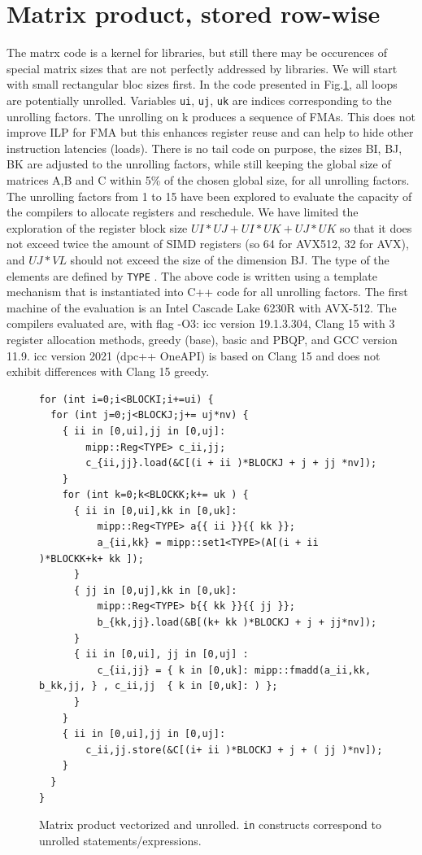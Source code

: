 \documentclass[sigconf,review]{acmart}
\begin{document}
\section{Matrix product, stored row-wise}
The matrx code is a kernel for libraries, but still there may be occurences of special matrix sizes that are not perfectly addressed by libraries. We will start with small rectangular bloc sizes first. In the code presented in Fig.\ref{fig:gemm}, all loops are potentially unrolled. Variables \texttt{ui}, \texttt{uj}, \texttt{uk}
are indices corresponding to the unrolling factors. The unrolling on k
produces a sequence of FMAs. This does not improve ILP for FMA but
this enhances register reuse and can help to hide other instruction
latencies (loads).  There is no tail code on purpose, the sizes BI,
BJ, BK are adjusted to the unrolling factors, while still keeping the
global size of matrices A,B and C within 5\% of the chosen global
size, for all unrolling factors.  The unrolling factors from 1 to 15
have been explored to evaluate the capacity of the compilers to
allocate registers and reschedule. We have limited the exploration of
the register block size $UI*UJ+UI*UK+UJ*UK$ so that it does not exceed
twice the amount of SIMD registers (so 64 for AVX512, 32 for AVX), and
$UJ*VL$ should not exceed the size of the dimension BJ.  The type of the elements are defined by \texttt{TYPE} . The above code
is written using a template mechanism that is instantiated
into C++ code for all unrolling factors.  The first machine of the
evaluation is an Intel Cascade Lake 6230R with AVX-512. The compilers
evaluated are, with flag -O3: icc version 19.1.3.304,  Clang 15 with 3 register allocation methods, greedy
(base), basic and PBQP, and GCC version 11.9. icc version 2021
(dpc++ OneAPI) is based on Clang 15 and does not exhibit differences with Clang 15 greedy. 


\begin{figure}
  \begin{lstlisting}
for (int i=0;i<BLOCKI;i+=ui) {                
  for (int j=0;j<BLOCKJ;j+= uj*nv) {           
    { ii in [0,ui],jj in [0,uj]:
        mipp::Reg<TYPE> c_ii,jj;
        c_{ii,jj}.load(&C[(i + ii )*BLOCKJ + j + jj *nv]);
    }                
    for (int k=0;k<BLOCKK;k+= uk ) {            
      { ii in [0,ui],kk in [0,uk]:
          mipp::Reg<TYPE> a{{ ii }}{{ kk }};
          a_{ii,kk} = mipp::set1<TYPE>(A[(i + ii )*BLOCKK+k+ kk ]);
      }
      { jj in [0,uj],kk in [0,uk]:
          mipp::Reg<TYPE> b{{ kk }}{{ jj }};
          b_{kk,jj}.load(&B[(k+ kk )*BLOCKJ + j + jj*nv]);
      }    
      { ii in [0,ui], jj in [0,uj] :
          c_{ii,jj} = { k in [0,uk]: mipp::fmadd(a_ii,kk, b_kk,jj, } , c_ii,jj  { k in [0,uk]: ) };
      }
    }
    { ii in [0,ui],jj in [0,uj]:
        c_ii,jj.store(&C[(i+ ii )*BLOCKJ + j + ( jj )*nv]);      
    }
  }
}
  \end{lstlisting}
  \caption{Matrix product vectorized and unrolled\label{fig:gemm}. \texttt{in} constructs correspond to unrolled statements/expressions. }
\end{figure}
\end{document}
